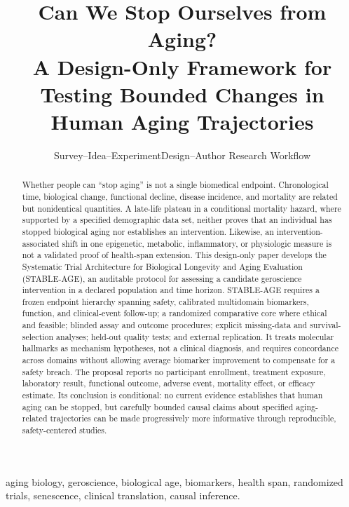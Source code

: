 \documentclass[10pt,conference]{IEEEtran}
\begin{document}
\title{Can We Stop Ourselves from Aging?\\
A Design-Only Framework for Testing Bounded Changes in Human Aging Trajectories}

\author{Survey--Idea--ExperimentDesign--Author Research Workflow}

\maketitle

\begin{abstract}
Whether people can ``stop aging'' is not a single biomedical endpoint. Chronological time, biological change, functional decline, disease incidence, and mortality are related but nonidentical quantities. A late-life plateau in a conditional mortality hazard, where supported by a specified demographic data set, neither proves that an individual has stopped biological aging nor establishes an intervention. Likewise, an intervention-associated shift in one epigenetic, metabolic, inflammatory, or physiologic measure is not a validated proof of health-span extension. This design-only paper develops the Systematic Trial Architecture for Biological Longevity and Aging Evaluation (STABLE-AGE), an auditable protocol for assessing a candidate geroscience intervention in a declared population and time horizon. STABLE-AGE requires a frozen endpoint hierarchy spanning safety, calibrated multidomain biomarkers, function, and clinical-event follow-up; a randomized comparative core where ethical and feasible; blinded assay and outcome procedures; explicit missing-data and survival-selection analyses; held-out quality tests; and external replication. It treats molecular hallmarks as mechanism hypotheses, not a clinical diagnosis, and requires concordance across domains without allowing average biomarker improvement to compensate for a safety breach. The proposal reports no participant enrollment, treatment exposure, laboratory result, functional outcome, adverse event, mortality effect, or efficacy estimate. Its conclusion is conditional: no current evidence establishes that human aging can be stopped, but carefully bounded causal claims about specified aging-related trajectories can be made progressively more informative through reproducible, safety-centered studies.
\end{abstract}

\begin{IEEEkeywords}
aging biology, geroscience, biological age, biomarkers, health span, randomized trials, senescence, clinical translation, causal inference.
\end{IEEEkeywords}
\end{document}
